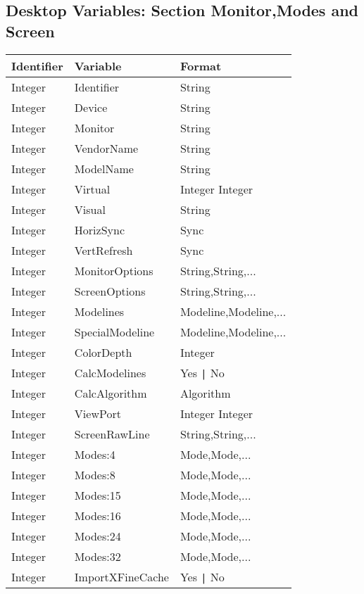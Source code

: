\subsection{Desktop Variables: Section Monitor,Modes and Screen}
\begin{tabular}[h]{|p{2cm}|p{4cm}|p{7cm}|}
 \hline
 \textbf{Identifier} & \textbf{Variable}     & \textbf{Format}        \\
 \hline
 Integer & Identifier       & String                             \\  
 Integer & Device           & String                             \\
 Integer & Monitor          & String                             \\
 Integer & VendorName       & String                             \\
 Integer & ModelName        & String                             \\
 Integer & Virtual          & Integer Integer                    \\
 Integer & Visual           & String                             \\
 Integer & HorizSync        & Sync                               \\
 Integer & VertRefresh      & Sync                               \\
 Integer & MonitorOptions   & String,String,...                  \\
 Integer & ScreenOptions    & String,String,...                  \\
 Integer & Modelines        & Modeline,Modeline,...              \\
 Integer & SpecialModeline  & Modeline,Modeline,...              \\
 Integer & ColorDepth       & Integer                            \\
 Integer & CalcModelines    & Yes \verb+|+ No                    \\
 Integer & CalcAlgorithm    & Algorithm                          \\
 Integer & ViewPort         & Integer Integer                    \\
 Integer & ScreenRawLine    & String,String,...                  \\
 Integer & Modes:4          & Mode,Mode,...                      \\
 Integer & Modes:8          & Mode,Mode,...                      \\
 Integer & Modes:15         & Mode,Mode,...                      \\
 Integer & Modes:16         & Mode,Mode,...                      \\
 Integer & Modes:24         & Mode,Mode,...                      \\
 Integer & Modes:32         & Mode,Mode,...                      \\
 Integer & ImportXFineCache & Yes \verb+|+ No                    \\
 \hline
\end{tabular}

